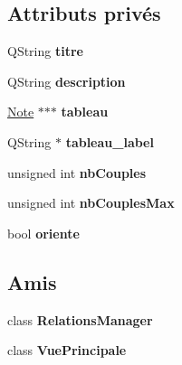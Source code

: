 \subsection*{Attributs privés}
\begin{DoxyCompactItemize}
\item 
\hypertarget{class_relation_a346e9b10df6757dee8dc13cb2f876357}{Q\-String {\bfseries titre}}\label{class_relation_a346e9b10df6757dee8dc13cb2f876357}

\item 
\hypertarget{class_relation_a1140829291bd04a86d0b840524692703}{Q\-String {\bfseries description}}\label{class_relation_a1140829291bd04a86d0b840524692703}

\item 
\hypertarget{class_relation_acb36aff9db6937210f52d6eadbb635c5}{\hyperlink{class_note}{Note} $\ast$$\ast$$\ast$ {\bfseries tableau}}\label{class_relation_acb36aff9db6937210f52d6eadbb635c5}

\item 
\hypertarget{class_relation_a2dffd4829aece8f3c2c91c07d8fa7052}{Q\-String $\ast$ {\bfseries tableau\-\_\-label}}\label{class_relation_a2dffd4829aece8f3c2c91c07d8fa7052}

\item 
\hypertarget{class_relation_a70298ba350d93fe1e6a5c12e4174f3bb}{unsigned int {\bfseries nb\-Couples}}\label{class_relation_a70298ba350d93fe1e6a5c12e4174f3bb}

\item 
\hypertarget{class_relation_a28e68283a2dbd4c7f25ec5dc7e14aa3c}{unsigned int {\bfseries nb\-Couples\-Max}}\label{class_relation_a28e68283a2dbd4c7f25ec5dc7e14aa3c}

\item 
\hypertarget{class_relation_afbc8d05781cdd560010fff14511d1776}{bool {\bfseries oriente}}\label{class_relation_afbc8d05781cdd560010fff14511d1776}

\end{DoxyCompactItemize}
\subsection*{Amis}
\begin{DoxyCompactItemize}
\item 
\hypertarget{class_relation_ac617894445bd4f12c905741b1b4f9f6a}{class {\bfseries Relations\-Manager}}\label{class_relation_ac617894445bd4f12c905741b1b4f9f6a}

\item 
\hypertarget{class_relation_a7c44822b658a328771753fe0aaa8b7ae}{class {\bfseries Vue\-Principale}}\label{class_relation_a7c44822b658a328771753fe0aaa8b7ae}

\end{DoxyCompactItemize}


